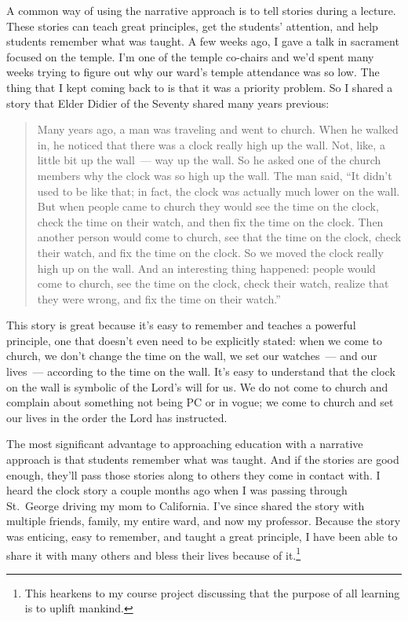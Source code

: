 \documentclass[12pt]{article}
\begin{document}
A common way of using the narrative approach is to tell stories during a lecture. These stories can teach great principles, get the students' attention, and help students remember what was taught. A few weeks ago, I gave a talk in sacrament focused on the temple. I'm one of the temple co-chairs and we'd spent many weeks trying to figure out why our ward's temple attendance was so low. The thing that I kept coming back to is that it was a priority problem. So I shared a story that Elder Didier of the Seventy shared many years previous:
\begin{quote}
    Many years ago, a man was traveling and went to church. When he walked in, he noticed that there was a clock really high up the wall. Not, like, a little bit up the wall~--- way up the wall. So he asked one of the church members why the clock was so high up the wall. The man said, ``It didn't used to be like that; in fact, the clock was actually much lower on the wall. But when people came to church they would see the time on the clock, check the time on their watch, and then fix the time on the clock. Then another person would come to church, see that the time on the clock, check their watch, and fix the time on the clock. So we moved the clock really high up on the wall. And an interesting thing happened: people would come to church, see the time on the clock, check their watch, realize that they were wrong, and fix the time on their watch.''
\end{quote}
This story is great because it's easy to remember and teaches a powerful principle, one that doesn't even need to be explicitly stated: when we come to church, we don't change the time on the wall, we set our watches~--- and our lives~--- according to the time on the wall. It's easy to understand that the clock on the wall is symbolic of the Lord's will for us. We do not come to church and complain about something not being PC or in vogue; we come to church and set our lives in the order the Lord has instructed.

The most significant advantage to approaching education with a narrative approach is that students remember what was taught. And if the stories are good enough, they'll pass those stories along to others they come in contact with. I heard the clock story a couple months ago when I was passing through St.\ George driving my mom to California. I've since shared the story with multiple friends, family, my entire ward, and now my professor. Because the story was enticing, easy to remember, and taught a great principle, I have been able to share it with many others and bless their lives because of it.\footnote{This hearkens to my course project discussing that the purpose of all learning is to uplift mankind.}
\end{document}
